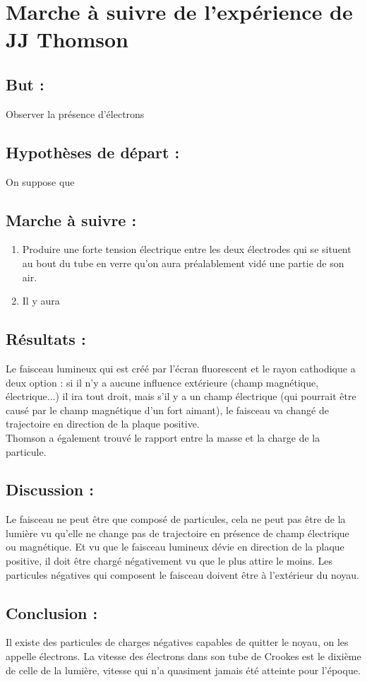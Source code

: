 \documentclass[../main.tex]{subfiles}
\begin{document}
\section{Marche à suivre de l'expérience de JJ Thomson}

\subsection{But :}
Observer la présence d'électrons

\subsection{Hypothèses de départ :}
On suppose que 
\subsection{Marche à suivre :}

\begin{enumerate}
    \item Produire une forte tension électrique entre les deux électrodes qui se situent au bout du tube en verre qu'on aura préalablement vidé une partie de son air.
    \item Il y aura 
\end{enumerate}

\subsection{Résultats :}
Le faisceau lumineux qui est créé par l'écran fluorescent et le rayon cathodique a deux option : si il n'y a aucune influence extérieure (champ magnétique, électrique...) il ira tout droit, mais s'il y a un champ électrique (qui pourrait être causé par le champ magnétique d'un fort aimant), le faisceau va changé de trajectoire en direction de la plaque positive.\\
Thomson a également trouvé le rapport entre la masse et la charge de la particule.

\subsection{Discussion :}
Le faisceau ne peut être que composé de particules, cela ne peut pas être de la lumière vu qu'elle ne change pas de trajectoire en présence de champ électrique ou magnétique. Et vu que le faisceau lumineux dévie en direction de la plaque positive, il doit être chargé négativement vu que le plus attire le moins. Les particules négatives qui composent le faisceau doivent être à l'extérieur du noyau.
\subsection{Conclusion :}

Il existe des particules de charges négatives capables de quitter le noyau, on les appelle électrons. La vitesse des électrons dans son tube de Crookes est le dixième de celle de la lumière, vitesse qui n'a quasiment jamais été atteinte pour l'époque.   
\end{document}
